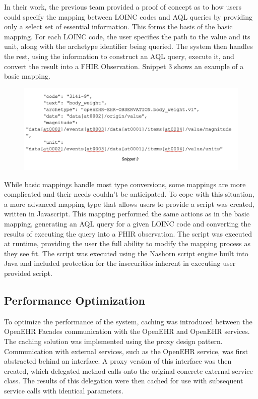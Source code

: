 \documentclass[sigconf]{acmart}
\begin{document}
In their work, the previous team provided a proof of concept as to how users could specify the mapping between LOINC codes and AQL queries by providing only a select set of essential information. This forms the basis of the basic mapping. For each LOINC code, the user specifies the path to the value and its unit, along with the archetype identifier being queried. The system then handles the rest, using the information to construct an AQL query, execute it, and convert the result into a FHIR Observation. Snippet 3 shows an example of a basic mapping. 

\begin{figure}[!!h] 
	\centering 
	\includegraphics[width=0.8\columnwidth]{figure4.png}
\end{figure}

While basic mappings handle most type conversions, some mappings are more complicated and their needs couldn't be anticipated. To cope with this situation, a more advanced mapping type that allows users to provide a script was created, written in Javascript. This mapping performed the same actions as in the basic mapping, generating an AQL query for a given LOINC code and converting the results of executing the query into a FHIR observation. The script was executed at runtime, providing the user the full ability to modify the mapping process as they see fit. The script was executed using the Nashorn script engine built into Java and included protection for the insecurities inherent in executing user provided script.

\subsection{Performance Optimization}
To optimize the performance of the system, caching was introduced between the OpenEHR Facades communication with the OpenEHR and OpenEHR services. The caching solution was implemented using the proxy design pattern. Communication with external services, such as the OpenEHR service, was first abstracted behind an interface. A proxy version of this interface was then created, which delegated method calls onto the original concrete external service class. The results of this delegation were then cached for use with subsequent service calls with identical parameters. 
\end{document}
